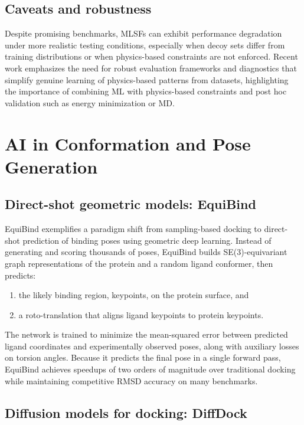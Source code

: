 \documentclass[12pt]{article}
\begin{document}
\subsection{Caveats and robustness}

Despite promising benchmarks, MLSFs can exhibit performance degradation under more realistic testing conditions, especially when decoy sets differ from training distributions or when physics-based constraints are not enforced.\cite{CH13_meli2022dlreview,CH13_durant2025robustly} Recent work emphasizes the need for robust evaluation frameworks and diagnostics that simplify genuine learning of physics-based patterns from datasets, highlighting the importance of combining ML with physics-based constraints and post hoc validation such as energy minimization or MD.\cite{CH13_posebusters2023,CH13_durant2025robustly}

\section{AI in Conformation and Pose Generation}

\subsection{Direct-shot geometric models: EquiBind}

EquiBind exemplifies a paradigm shift from sampling-based docking to direct-shot prediction of binding poses using geometric deep learning.\cite{CH13_stark2022equibind} Instead of generating and scoring thousands of poses, EquiBind builds SE(3)-equivariant graph representations of the protein and a random ligand conformer, then predicts:
\begin{enumerate}
  \item the likely binding region, keypoints, on the protein surface, and
  \item a roto-translation that aligns ligand keypoints to protein keypoints.
\end{enumerate}
The network is trained to minimize the mean-squared error between predicted ligand coordinates and experimentally observed poses, along with auxiliary losses on torsion angles.\cite{CH13_stark2022equibind,CH13_equibindnews2023} Because it predicts the final pose in a single forward pass, EquiBind achieves speedups of two orders of magnitude over traditional docking while maintaining competitive RMSD accuracy on many benchmarks.\cite{CH13_stark2022equibind}

\subsection{Diffusion models for docking: DiffDock}
\end{document}
